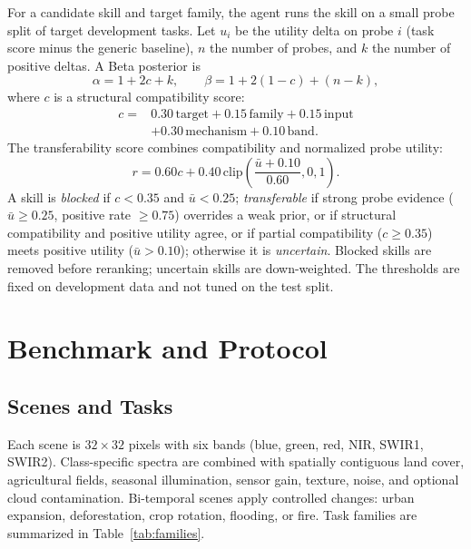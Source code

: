 \documentclass[journal]{IEEEtran}
\begin{document}
For a candidate skill and target family, the agent runs the skill on a small probe split of target development tasks. Let $u_i$ be the utility delta on probe $i$ (task score minus the generic baseline), $n$ the number of probes, and $k$ the number of positive deltas. A Beta posterior is
\begin{equation}
\alpha=1+2c+k,\qquad \beta=1+2(1-c)+(n-k),
\end{equation}
where $c$ is a structural compatibility score:
\begin{equation}
\begin{aligned}
c={}&0.30\,\mathrm{target}+0.15\,\mathrm{family}+0.15\,\mathrm{input}\\
&+0.30\,\mathrm{mechanism}+0.10\,\mathrm{band}.
\end{aligned}
\end{equation}
The transferability score combines compatibility and normalized probe utility:
\begin{equation}
r=0.60c+0.40\,\mathrm{clip}\!\left(\frac{\bar u+0.10}{0.60},0,1\right).
\end{equation}
A skill is \emph{blocked} if $c<0.35$ and $\bar u<0.25$; \emph{transferable} if strong probe evidence ($\bar u\ge0.25$, positive rate $\ge0.75$) overrides a weak prior, or if structural compatibility and positive utility agree, or if partial compatibility ($c\ge0.35$) meets positive utility ($\bar u>0.10$); otherwise it is \emph{uncertain}. Blocked skills are removed before reranking; uncertain skills are down-weighted. The thresholds are fixed on development data and not tuned on the test split.

\section{Benchmark and Protocol}

\subsection{Scenes and Tasks}

Each scene is $32\times32$ pixels with six bands (blue, green, red, NIR, SWIR1, SWIR2). Class-specific spectra are combined with spatially contiguous land cover, agricultural fields, seasonal illumination, sensor gain, texture, noise, and optional cloud contamination. Bi-temporal scenes apply controlled changes: urban expansion, deforestation, crop rotation, flooding, or fire. Task families are summarized in Table~\ref{tab:families}.
\end{document}
